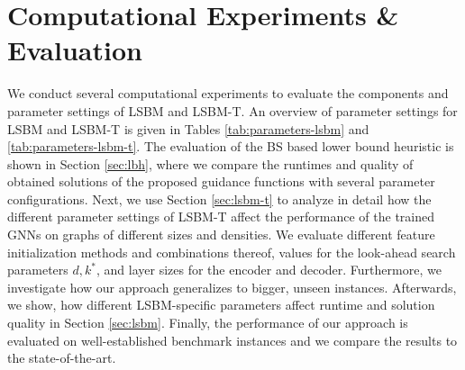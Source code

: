 \documentclass[draft,final]{vutinfth} %
\begin{document}

\chapter{Computational Experiments \& Evaluation}\label{chp:evaluation}

We conduct several computational experiments to evaluate the components and parameter settings of LSBM and LSBM-T. An overview of parameter settings for LSBM and LSBM-T is given in Tables \ref{tab:parameters-lsbm} and \ref{tab:parameters-lsbm-t}. 
The evaluation of the BS based lower bound heuristic is shown in Section \ref{sec:lbh}, where we compare the runtimes and quality of obtained solutions of the proposed guidance functions with several parameter configurations. 
Next, we use Section \ref{sec:lsbm-t} to analyze in detail how the different parameter settings of LSBM-T affect the performance of the trained GNNs on graphs of different sizes and densities. We evaluate different feature initialization methods and combinations thereof, values for the look-ahead search parameters $d, k^*$, and layer sizes for the encoder and decoder. Furthermore, we investigate how our approach generalizes to bigger, unseen instances. 
Afterwards, we show, how different LSBM-specific parameters affect runtime and solution quality in Section \ref{sec:lsbm}. 
Finally, the performance of our approach is evaluated on well-established benchmark instances and we compare the results to the state-of-the-art. 
\end{document}
